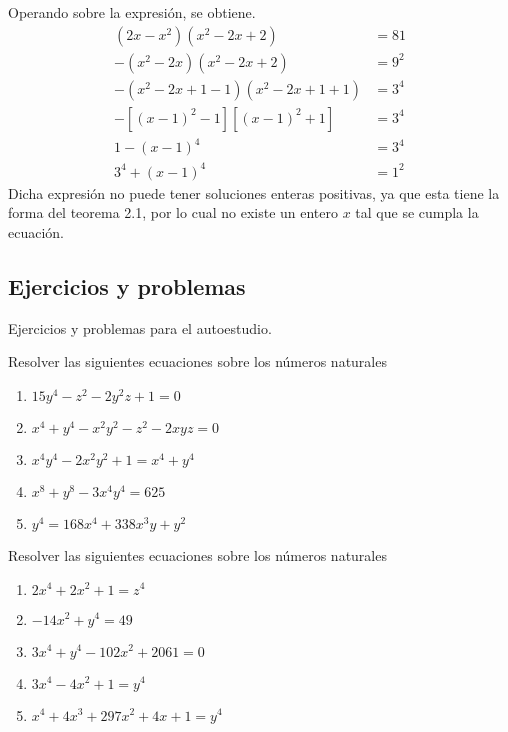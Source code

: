\begin{solution}
    Operando sobre la expresión, se obtiene.
    \begin{align*}
    (2x - x^2)(x^2 -2x + 2) &= 81 \\
    -(x^2 - 2x)(x^2 -2x + 2) &= 9^2 \\
    -(x^2 - 2x + 1 - 1)(x^2 -2x + 1 + 1) &= 3^4\\
    -\left[(x - 1)^2 - 1\right]\left[(x - 1)^2 + 1\right] &= 3^4\\
    1 - (x - 1)^4 &= 3^4\\
    3^4 + (x - 1)^4 &= 1^2
    \end{align*}
    Dicha expresión no puede tener soluciones enteras positivas, ya que esta tiene la forma del teorema 2.1, por lo cual no existe un entero $x$ tal que se cumpla la ecuación.
\end{solution}



\subsection{Ejercicios y problemas}
Ejercicios y problemas para el autoestudio.

\begin{exercise}
    Resolver las siguientes ecuaciones sobre los números naturales
    \begin{multicols}{2}
        \begin{enumerate}
            \item $15y^4 - z^2 - 2y^2 z + 1 = 0$
            \item $x^4 + y^4 - x^2 y^2 - z^2 - 2xyz = 0$
            \item $x^4 y^4 - 2x^2 y^2 + 1 = x^4 + y^4$
            \item $x^8 + y^8 - 3x^{4}y^4 = 625$
            \item $y^4 = 168x^4 + 338x^3 y + y^2$
        \end{enumerate}
    \end{multicols}
\end{exercise}

\begin{exercise}
    Resolver las siguientes ecuaciones sobre los números naturales
    \begin{multicols}{2}
        \begin{enumerate}
            \item $2x^4 + 2x^2 + 1 = z^4$
            \item $-14x^2 + y^4 = 49$
            \item $3x^4 + y^4 - 102x^2 + 2061 = 0$
            \item $3x^4 - 4x^2 + 1 = y^4$
            \item $x^4 + 4x^3 + 297x^2 + 4x + 1 = y^4$
        \end{enumerate}
    \end{multicols}
\end{exercise}


